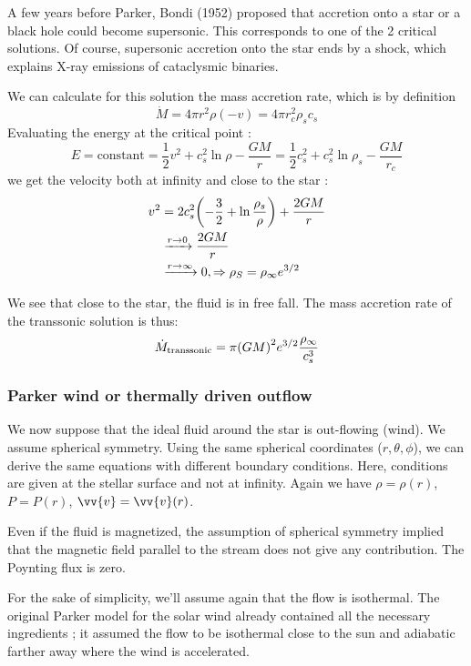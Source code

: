 \documentclass[10pt,a4paper,english,draft]{article}
\let\originalleft\left
\let\originalright\right
\renewcommand{\left}{\mathopen{}\mathclose\bgroup\originalleft}
\renewcommand{\right}{\aftergroup\egroup\originalright}
\begin{document}
A few years before Parker, Bondi (1952) proposed that accretion onto a star or a black hole could become supersonic. This corresponds to one of the 2 critical solutions. Of course, supersonic accretion onto the star ends by a shock, which explains X-ray emissions of cataclysmic binaries.

We can calculate for this solution the mass accretion rate, which is by definition
\begin{equation}
  \dot{M} = 4\pi r^2 \rho (-v) = 4\pi r_c^2 \rho_s c_s
\end{equation}
Evaluating the energy at the critical point :
\begin{equation}
  E = \textrm{constant} = \frac{1}{2}v^2 + c_s^2 \ln\rho - \frac{GM}{r} = \frac{1}{2}c_s^2 + c_s^2 \ln \rho_s - \frac{GM}{r_c}
\end{equation}
we get the velocity both at infinity and close to the star :
\begin{align}
  v^2 &= 2c_s^2 \left( -\frac{3}{2} + \ln \frac{\rho_s}{\rho} \right)  + \frac{2GM}{r} \\
      & \xrightarrow{r\to 0} \frac{2GM}{r} \\
      & \xrightarrow{r\to\infty} 0, \Rightarrow \rho_S = \rho_\infty e^{3/2}
\end{align}

We see that close to the star, the fluid is in free fall. The mass accretion rate of the transsonic solution is thus:
\begin{equation}
  \dot{M}_\mathrm{transsonic} = \pi \left( GM \right)^2 e^{3/2} \frac{\rho_\infty}{c_s^3}
\end{equation}
\subsubsection{Parker wind or thermally driven outflow}
We now suppose that the ideal fluid around the star is out-flowing (wind). We assume spherical symmetry. Using the same spherical coordinates ($r, \theta, \phi$), we can derive the same equations with different boundary conditions. Here, conditions are given at the stellar surface and not at infinity. Again we have $\rho = \rho(r)$, $P = P(r)$, $\vv{v} = \vv{v}(r)$. 

Even if the fluid is magnetized, the assumption of spherical symmetry implied that the magnetic field parallel to the stream does not give any contribution. The Poynting flux is zero.

For the sake of simplicity, we'll assume again that the flow is isothermal. The original Parker model for the solar wind already contained all the necessary ingredients ; it assumed the flow to be isothermal close to the sun and adiabatic farther away where the wind is accelerated.
\end{document}
